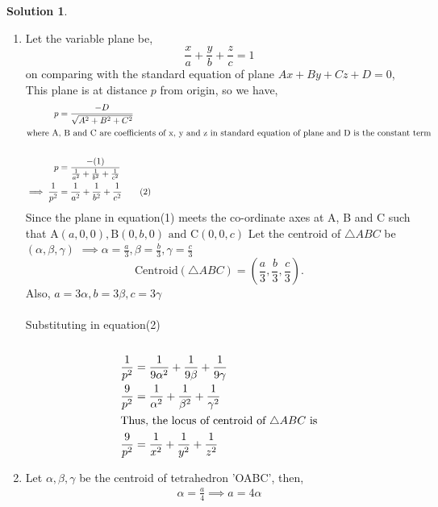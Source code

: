 \documentclass{article}
\theoremstyle{definition}
\newtheorem*{solution}{Solution}
\begin{document}
\begin{solution}{\ \newline}
\begin{enumerate}
	
\item Let the variable plane be, \[
		\frac{x}{a}+\frac{y}{b}+ \frac{z}{c} = 1 \tag{1}
	\]
	on comparing with the standard equation of plane $Ax + By + Cz+ D = 0$, \\
	This plane is at distance $p$ from origin, so we have,
	\begin{align*}
		p &= \frac{-D}{\sqrt{A^2 + B^2 + C^2}} \\
		\intertext{where A, B and C are coefficients of x, y and z in standard equation of plane and D is the constant term} \\
		p &= \frac{-(1)}{\frac{1}{a^2}+\frac{1}{b^2}+\frac{1}{c^2}} \\
		\implies \frac{1}{p^2} &= \frac{1}{a^2} + \frac{1}{b^2} + \frac{1}{c^2} \tag{2}
	\end{align*}
	Since the plane in equation(1) meets the co-ordinate axes at A, B and C such that \newline
	$ \text{A}(a, 0, 0), \text{B}(0, b, 0) \text{ and } \text{C}(0, 0, c)$ \newline \newline
	Let the centroid of $\triangle ABC$ be  $ \text{}(\alpha, \beta, \gamma)$ \newline
	$\implies \alpha = \frac{a}{3}, \beta= \frac{b}{3}, \gamma = \frac{c}{3}$ \\
	\[
		\boxed{\text{Centroid}(\triangle ABC) = \left(\frac{a}{3}, \frac{b}{3}, \frac{c}{3}\right)}
	.\]
	Also, $a = 3\alpha, b = 3\beta, c = 3\gamma$ \\\\
	Substituting in equation(2)\\\\
	\begin{align*}
		\frac{1}{p^2} &= \frac{1}{9\alpha^2} + \frac{1}{9\beta} + \frac{1}{9\gamma} \\
	\frac{9}{p^2} &= \frac{1}{\alpha^2}+\frac{1}{\beta^2} + \frac{1}{\gamma^2} \\
	\intertext{Thus, the locus of centroid of $\triangle ABC$ is}
	\frac{9}{p^2} &= \frac{1}{x^2} + \frac{1}{y^2} + \frac{1}{z^2}
	\end{align*}
\item Let $\alpha, \beta, \gamma$ be the centroid of tetrahedron 'OABC', then,
	\begin{align*}
		\alpha = \frac{a}{4} \implies a = 4\alpha \\

\end{align*}
\end{enumerate}
\end{solution}
\end{document}
